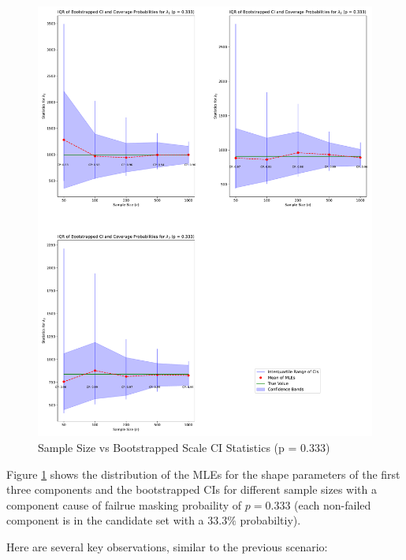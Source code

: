 \documentclass[
]{article}
\begin{document}
\begin{figure}

{\centering \includegraphics{image/plot-n-vs-stats-p333-scale} 

}

\caption{Sample Size vs Bootstrapped Scale CI Statistics (p = 0.333)}\label{fig:samp-size-n-vs-stats-p333-scale}
\end{figure}

Figure \ref{fig:samp-size-n-vs-stats-p333-scale} shows the distribution
of the MLEs for the shape parameters of the first three components and
the bootstrapped CIs for different sample sizes with a component cause
of failrue masking probaility of \(p = 0.333\) (each non-failed
component is in the candidate set with a \(33.3\%\) probabiltiy).

Here are several key observations, similar to the previous scenario:
\end{document}
